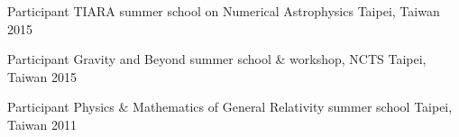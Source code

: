 




\begin{cvhonors}


\cvhonor
{Participant} %
{TIARA summer school on Numerical Astrophysics} %
{Taipei, Taiwan} %
{2015} %


\cvhonor
{Participant} %
{Gravity and Beyond summer school \& workshop, NCTS} %
{Taipei, Taiwan} %
{2015} %


\cvhonor
{Participant} %
{Physics \& Mathematics of General Relativity summer school} %
{Taipei, Taiwan} %
{2011} %



\end{cvhonors}

